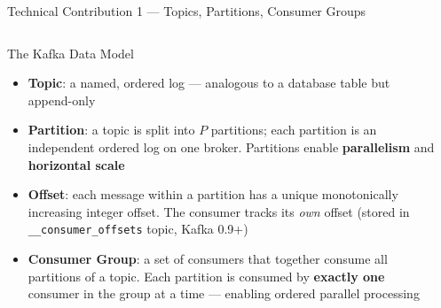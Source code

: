 \documentclass[aspectratio=169,10pt]{beamer}
\begin{document}
\begin{frame}{Technical Contribution 1 — Topics, Partitions, Consumer Groups}
  \begin{columns}[T]
      \begin{block}{The Kafka Data Model}
        \begin{itemize}
          \item \textbf{Topic}: a named, ordered log — analogous to
                a database table but append-only
          \item \textbf{Partition}: a topic is split into $P$ partitions;
                each partition is an independent ordered log on one broker.
                Partitions enable \textbf{parallelism} and
                \textbf{horizontal scale}
          \item \textbf{Offset}: each message within a partition has a
                unique monotonically increasing integer offset.
                The consumer tracks its \emph{own} offset
                (stored in \texttt{\_\_consumer\_offsets} topic, Kafka 0.9+)
          \item \textbf{Consumer Group}: a set of consumers that
                together consume all partitions of a topic.
                Each partition is consumed by \textbf{exactly one}
                consumer in the group at a time — enabling
                ordered parallel processing
        \end{itemize}
      \end{block}

      \begin{center}
\end{center}
\end{columns}
\end{frame}
\end{document}
